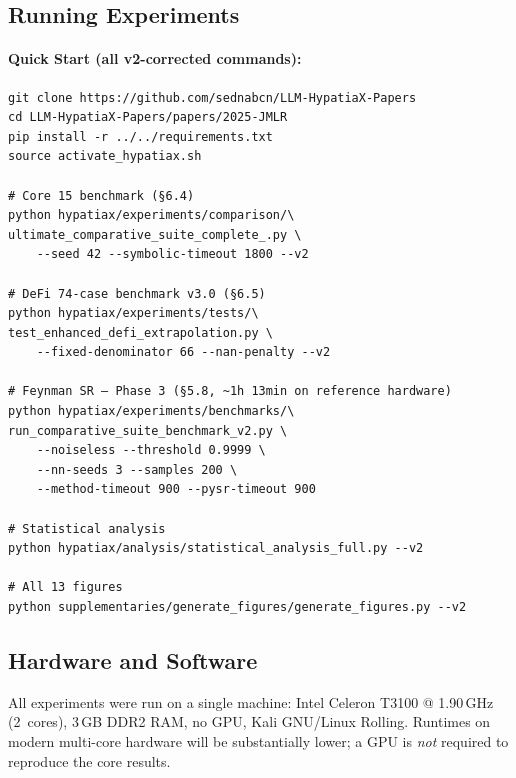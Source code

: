 \documentclass[11pt,a4paper]{article}
\begin{document}
\subsection{Running Experiments}

\paragraph{Quick Start (all v2-corrected commands):}
\begin{small}
\begin{verbatim}
git clone https://github.com/sednabcn/LLM-HypatiaX-Papers
cd LLM-HypatiaX-Papers/papers/2025-JMLR
pip install -r ../../requirements.txt
source activate_hypatiax.sh

# Core 15 benchmark (§6.4)
python hypatiax/experiments/comparison/\
ultimate_comparative_suite_complete_.py \
    --seed 42 --symbolic-timeout 1800 --v2

# DeFi 74-case benchmark v3.0 (§6.5)
python hypatiax/experiments/tests/\
test_enhanced_defi_extrapolation.py \
    --fixed-denominator 66 --nan-penalty --v2

# Feynman SR — Phase 3 (§5.8, ~1h 13min on reference hardware)
python hypatiax/experiments/benchmarks/\
run_comparative_suite_benchmark_v2.py \
    --noiseless --threshold 0.9999 \
    --nn-seeds 3 --samples 200 \
    --method-timeout 900 --pysr-timeout 900

# Statistical analysis
python hypatiax/analysis/statistical_analysis_full.py --v2

# All 13 figures
python supplementaries/generate_figures/generate_figures.py --v2
\end{verbatim}
\end{small}

\subsection{Hardware and Software}

All experiments were run on a single machine: Intel Celeron T3100 @
1.90\,GHz (2~cores), 3\,GB DDR2 RAM, no GPU, Kali GNU/Linux Rolling.
Runtimes on modern multi-core hardware will be substantially lower; a GPU
is \emph{not} required to reproduce the core results.
\end{document}
